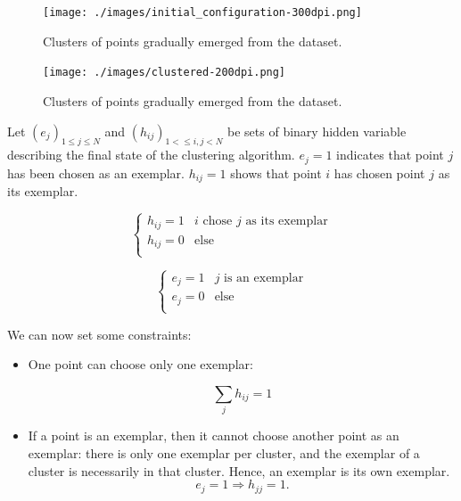 \documentclass{ipol}
\begin{document}
\begin{figure}
\begin{center}
\texttt{[image: ./images/initial\_configuration-300dpi.png]}
\end{center}
\caption{Clusters of points gradually emerged from the dataset.}
\end{figure}
\begin{figure}
\begin{center}
\texttt{[image: ./images/clustered-200dpi.png]}
\end{center}
\caption{Clusters of points gradually emerged from the dataset.}
\end{figure}

Let $(e_j)_{1 \leq j \leq N}$ and $(h_{ij})_{1 < \leq i, j < N}$ be sets of
binary hidden variable describing the final state of the clustering algorithm.
$e_j = 1$ indicates that point $j$ has been chosen as an exemplar. $h_{ij} =
1$ shows that point $i$ has chosen point $j$ as its exemplar. 

\begin{equation*}
\begin{cases}
  h_{ij} = 1 & \text{$i$ chose $j$ as its exemplar}\\
  h_{ij} = 0 & \text{else} \\
\end{cases}
\end{equation*}

\begin{equation*}
\begin{cases}
e_j = 1 & \text{$j$ is an exemplar} \\
e_j = 0 & \text{else} \\
\end{cases}
\end{equation*}

We can now set some constraints:

\begin{itemize}
\item One point can choose only one exemplar:

\begin{equation}
\sum_j h_{ij} = 1
\end{equation}

\item If a point is an exemplar, then it cannot choose another point as an
exemplar: there is only one exemplar per cluster, and the exemplar of a
cluster is necessarily in that cluster. Hence, an exemplar is its own
exemplar.
\begin{equation*}
e_{j} = 1 \Rightarrow h_{jj} = 1.
\end{equation*}
\end{itemize}
\end{document}
